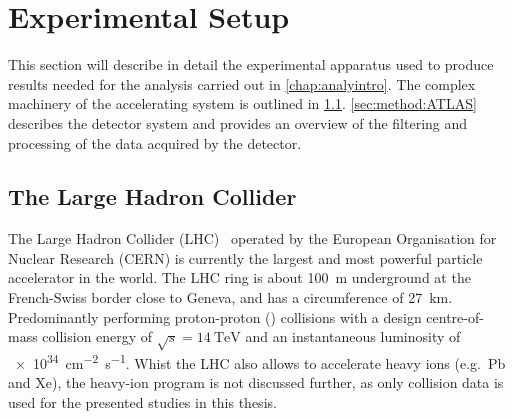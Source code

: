 \chapter{Experimental Setup}\label{chap:expSetup}
This section will describe in detail the experimental apparatus used to produce results needed for the analysis carried out in \cref{chap:analyintro}. The complex machinery of the accelerating system is outlined in \cref{sec:method:LHC}. \cref{sec:method:ATLAS} describes the detector system and provides an overview of the filtering and processing of the data acquired by the detector.

\section{The Large Hadron Collider}\label{sec:method:LHC}
The Large Hadron Collider (LHC)~\cite{LHC} operated by the European Organisation for Nuclear Research (CERN) is currently the largest and most powerful particle accelerator in the world. The LHC ring is about \SI{100}{\metre} underground at the French-Swiss border close to Geneva, and has a circumference of \SI{27}{\kilo\metre}. Predominantly performing proton-proton (\protonproton) collisions with a design centre-of-mass collision energy of $\sqrt{s} = \SI{14}{\tera\electronvolt}$ and an instantaneous luminosity of \SI{e34}{\centi\metre^{-2} \second^{-1}}. Whist the LHC also allows to accelerate heavy ions (e.g.\ Pb and Xe), the heavy-ion program is not discussed further, as only \protonproton collision data is used for the presented studies in this thesis. 

